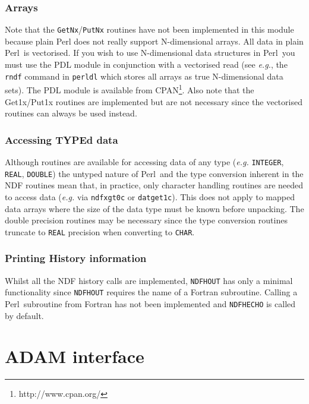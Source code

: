 \documentclass[twoside,11pt]{article}
\newcommand{\perl}{\xref{\textsf{Perl}}{sun193}{}}
\newcommand{\htmladdnormallinkfoot}[2]{#1\footnote{#2}}
\newcommand{\htmladdnormallink}[2]{#1}
\newcommand{\xref}[3]{#1}
\renewcommand{\_}{\texttt{\symbol{95}}}
\begin{document}
\subsubsection{Arrays}%

Note that the \texttt{GetNx}/\texttt{PutNx} routines have not been
implemented in this module because plain Perl does not really support
N-dimensional arrays.  All data in plain \perl\ is vectorised.  If you
wish to use N-dimensional data structures in \perl\ you must use the
\htmladdnormallink{PDL}{http://pdl.perl.org}
module in conjunction with a vectorised read (see \emph{e.g.}, the
\texttt{rndf} command in \texttt{perldl} which stores all arrays as
true N-dimensional data sets). The PDL module is available from
\htmladdnormallinkfoot{CPAN}{http://www.cpan.org/}. Also
note that the Get1x/Put1x routines are implemented but are not
necessary since the vectorised routines can always be used instead.

\subsubsection{Accessing TYPEd data}%

Although routines are available for accessing data of any type
(\emph{e.g.} \texttt{\_INTEGER}, \texttt{\_REAL}, \texttt{\_DOUBLE})
the untyped nature of \perl\ and the type conversion inherent in the NDF
routines mean that, in practice, only character handling routines are
needed to access data (\emph{e.g.} via \texttt{ndf\_xgt0c} or
\texttt{dat\_get1c}).  This does not apply to mapped data arrays where
the size of the data type must be known before unpacking.  The double
precision routines may be necessary since the type conversion routines
truncate to \texttt{\_REAL} precision when converting to \texttt{\_CHAR}.

\subsubsection{Printing History information}%

Whilst all the NDF history calls are implemented, \texttt{NDF\_HOUT} has
only a minimal functionality since \texttt{NDF\_HOUT} requires the name of a
Fortran subroutine.  Calling a \perl\ subroutine from Fortran has not been
implemented and \texttt{NDF\_HECHO} is called by default.



\section{ADAM interface\label{adam}}
\end{document}
